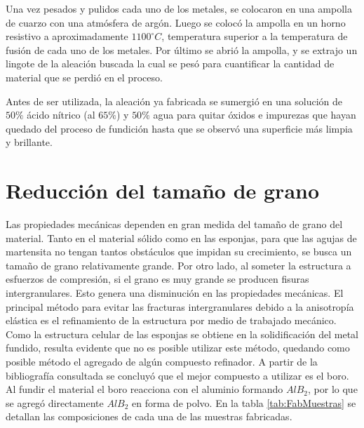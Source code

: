 \documentclass[a4paper,12pt,fleqn,twoside,openany]{book}
\begin{document}
Una vez pesados y pulidos cada uno de los metales, se colocaron en una ampolla de cuarzo con una atmósfera de argón. Luego se colocó la ampolla en 
un horno resistivo a aproximadamente $1100^\circ C$, temperatura superior a la temperatura de fusión de cada uno de los metales. Por último se abrió la ampolla, y se extrajo un 
lingote de la aleación buscada la cual se pesó para cuantificar la cantidad de material que se perdió en el proceso.  

Antes de ser utilizada, la aleación ya fabricada se sumergió en una solución de $50 \%$ ácido nítrico (al $65 \%$) y 
$50 \%$ agua para quitar óxidos e impurezas que hayan quedado del proceso de fundición hasta que se observó una superficie más limpia y brillante.

\section{Reducción del tamaño de grano} \label{FabClavos}


Las propiedades mecánicas dependen en gran medida del tamaño de grano del material. Tanto en el material sólido como en las esponjas, para que las agujas de martensita no tengan tantos obstáculos que impidan su crecimiento, se busca un tamaño de grano relativamente grande. Por otro 
lado, al someter la estructura a esfuerzos de compresión, si el grano es muy grande se producen fisuras intergranulares. Esto genera 
una disminución en las propiedades mecánicas.%
El principal método para evitar las fracturas intergranulares debido a la anisotropía elástica es el refinamiento de la estructura por medio de trabajado mecánico. Como la estructura 
celular de las esponjas se obtiene en la solidificación del metal fundido, resulta evidente que no es posible utilizar este método, quedando como posible método el agregado de algún compuesto refinador. A partir de la bibliografía consultada se concluyó que el 
mejor compuesto a utilizar es el boro. Al fundir el material el boro reacciona con el aluminio formando $AlB_2$, por lo que se agregó directamente $AlB_2$ en forma de polvo. En la tabla \ref{tab:FabMuestras} se detallan las composiciones de cada una de las muestras fabricadas. 
\end{document}
